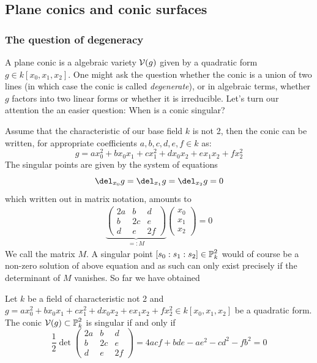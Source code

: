 \subsection{Plane conics and conic surfaces}

\subsubsection{The question of degeneracy}

A plane conic is a algebraic variety $\operatorname{\mathcal V}(g)$ given by a quadratic form $g \in k[x_0,x_1,x_2]$. One might ask the question whether the conic is a union of two lines (in which case the conic is called \emph{degenerate}), or in algebraic terms, whether $g$ factors into two linear forms or whether it is irreducible.
Let's turn our attention the an easier question: When is a conic singular?

Assume that the characteristic of our base field $k$ is not 2, then the conic can be written, for appropriate coefficients $a,b,c,d,e,f \in k$ as:
\begin{equation}
g = ax_0^2 + bx_0x_1 + cx_1^2 + dx_0x_2 + ex_1x_2 + fx_2^2
\end{equation}
The singular points are given by the system of equations
\begin{equation}
\del_{x_0} g = \del_{x_1} g = \del_{x_2} g = 0
\end{equation}
which written out in matrix notation, amounts to
\begin{align}
\underset{=:M}{\underbrace{
\begin{pmatrix}
2a & b & d \\
b & 2c & e \\
d & e & 2f
\end{pmatrix}
}}
\begin{pmatrix}
x_0 \\ x_1 \\ x_2
\end{pmatrix}
= 0
\end{align}
We call the matrix $M$.
A singular point $[s_0:s_1:s_2] \in \operatorname{\mathbb P}^2_k$ would of course be a non-zero solution of above equation and as such can only exist precisely if the determinant of $M$ vanishes.
So far we have obtained

\begin{corollary}
Let $k$ be a field of characteristic not 2 and $g =  ax_0^2 + bx_0x_1 + cx_1^2 + dx_0x_2 + ex_1x_2 + fx_2^2
\in k[x_0,x_1,x_2]$ be a quadratic form. The conic $\operatorname{\mathcal V}(g) \subset \operatorname{\mathbb P}^2_k$ is singular if and only if
\begin{equation}
\frac 12
\det
\begin{pmatrix}
2a & b & d \\
b & 2c & e \\
d & e & 2f
\end{pmatrix}
= 4acf + bde - ae^2 - cd^2 - fb^2
= 0
\end{equation}
\end{corollary}

